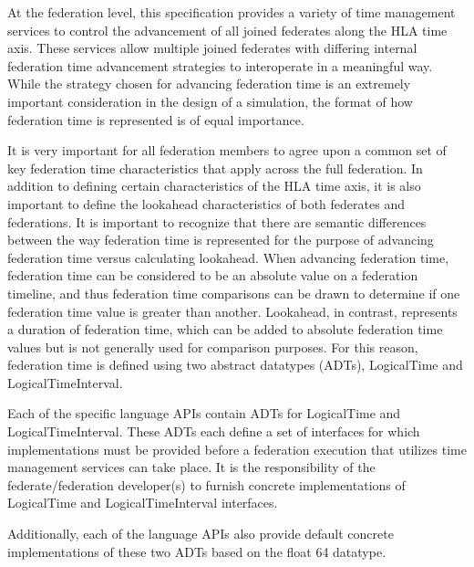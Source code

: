 \begin{annexstdpage}


    At the federation level, this specification provides a variety of time management services to control the advancement of all joined federates along the HLA time axis. These services allow multiple joined federates with differing internal federation time advancement strategies to interoperate in a meaningful way. While the strategy chosen for advancing federation time is an extremely important consideration in the design of a simulation, the format of how federation time is represented is of equal importance.

    It is very important for all federation members to agree upon a common set of key federation time characteristics that apply across the full federation. In addition to defining certain characteristics of the HLA time axis, it is also important to define the lookahead characteristics of both federates and federations. It is important to recognize that there are semantic differences between the way federation time is represented for the purpose of advancing federation time versus calculating lookahead. When advancing federation time, federation time can be considered to be an absolute value on a federation timeline, and thus federation time comparisons can be drawn to determine if one federation time value is greater than another. Lookahead, in contrast, represents a duration of federation time, which can be added to absolute federation time values but is not generally used for comparison purposes. For this reason, federation time is defined using two abstract datatypes (ADTs), LogicalTime and LogicalTimeInterval.

    Each of the specific language APIs contain ADTs for LogicalTime and LogicalTimeInterval. These ADTs each define a set of interfaces for which implementations must be provided before a federation execution that utilizes time management services can take place. It is the responsibility of the federate/federation developer(s) to furnish concrete implementations of LogicalTime and LogicalTimeInterval interfaces.

    Additionally, each of the language APIs also provide default concrete implementations of these two ADTs based on the float 64 datatype.



\end{annexstdpage}
